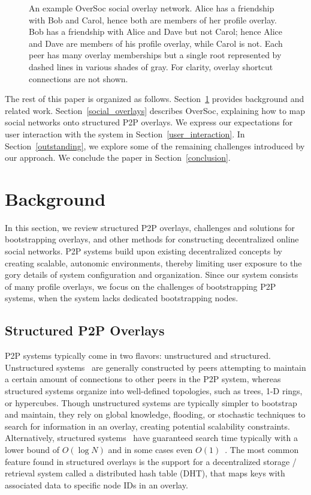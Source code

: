 \documentclass{IEEEtran}
\begin{document}
\begin{figure}[h]
\centering
{}
\caption{An example OverSoc social overlay network.  Alice has a friendship
with Bob and Carol, hence both are members of her profile overlay. Bob has a
friendship with Alice and Dave but not Carol; hence Alice and Dave are members
of his profile overlay, while Carol is not.  Each peer has many overlay
memberships but a single root represented by dashed lines in various shades of
gray.  For clarity, overlay shortcut connections are not shown.}
\label{fig:system}
\end{figure}

The rest of this paper is organized as follows.  Section~\ref{background}
provides background and related work.  Section~\ref{social_overlays} describes
OverSoc, explaining how to map social networks onto structured P2P overlays.
We express our expectations for user interaction with the system in
Section~\ref{user_interaction}.  In Section~\ref{outstanding}, we explore some
of the remaining challenges introduced by our approach.  We conclude the paper
in Section~\ref{conclusion}.

\section{Background}
\label{background}

In this section, we review structured P2P overlays, challenges and solutions
for bootstrapping overlays, and other methods for constructing decentralized
online social networks.  P2P systems build upon existing decentralized concepts
by creating scalable, autonomic environments, thereby limiting user exposure to
the gory details of system configuration and organization.  Since our system
consists of many profile overlays, we focus on the challenges of bootstrapping
P2P systems, when the system lacks dedicated bootstrapping nodes.

\subsection{Structured P2P Overlays}

P2P systems typically come in two flavors:  unstructured and structured.
Unstructured systems~\cite{gnutella, fasttrack} are generally constructed by
peers attempting to maintain a certain amount of connections to other peers in
the P2P system, whereas structured systems organize into well-defined
topologies, such as trees, 1-D rings, or hypercubes.  Though unstructured
systems are typically simpler to bootstrap and maintain, they rely on global
knowledge, flooding, or stochastic techniques to search for information in an
overlay, creating potential scalability constraints.  Alternatively, structured
systems~\cite{pastry, chord, symphony, kademlia, can} have guaranteed search
time typically with a lower bound of $O(\log N)$ and in some cases even
$O(1)$~\cite{beehive}.  The most common feature found in structured overlays is
the support for a decentralized storage / retrieval system called a distributed
hash table (DHT), that maps keys with associated data to specific node IDs in
an overlay.
\end{document}
